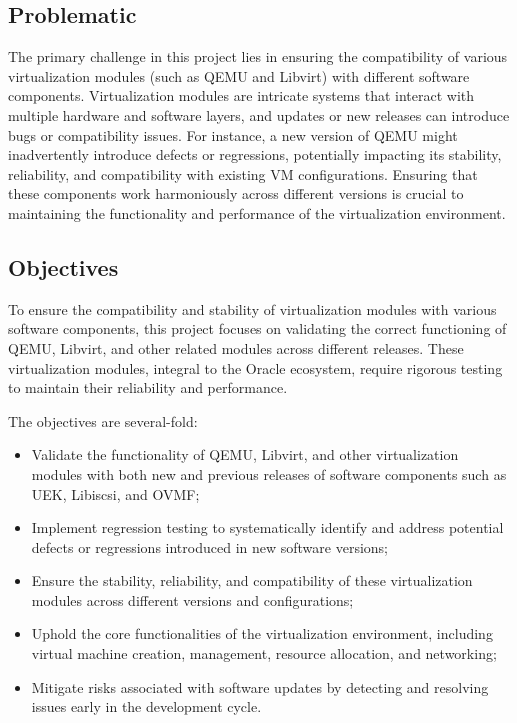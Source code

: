 \subsection{Problematic}
The primary challenge in this project lies in ensuring the compatibility of various virtualization modules (such as QEMU and Libvirt) with different software components. Virtualization modules are intricate systems that interact with multiple hardware and software layers, and updates or new releases can introduce bugs or compatibility issues. For instance, a new version of QEMU might inadvertently introduce defects or regressions, potentially impacting its stability, reliability, and compatibility with existing VM configurations. Ensuring that these components work harmoniously across different versions is crucial to maintaining the functionality and performance of the virtualization environment.

\subsection{Objectives}
To ensure the compatibility and stability of virtualization modules with various software components, this project focuses on validating the correct functioning of QEMU, Libvirt, and other related modules across different releases. These virtualization modules, integral to the Oracle ecosystem, require rigorous testing to maintain their reliability and performance.\mynewline

The objectives are several-fold:
\begin{itemize}
    \item Validate the functionality of QEMU, Libvirt, and other virtualization modules with both new and previous releases of software components such as UEK, Libiscsi, and OVMF;
    \item Implement regression testing to systematically identify and address potential defects or regressions introduced in new software versions;
    \item Ensure the stability, reliability, and compatibility of these virtualization modules across different versions and configurations;
    \item Uphold the core functionalities of the virtualization environment, including virtual machine creation, management, resource allocation, and networking;
    \item Mitigate risks associated with software updates by detecting and resolving issues early in the development cycle.
\end{itemize}

